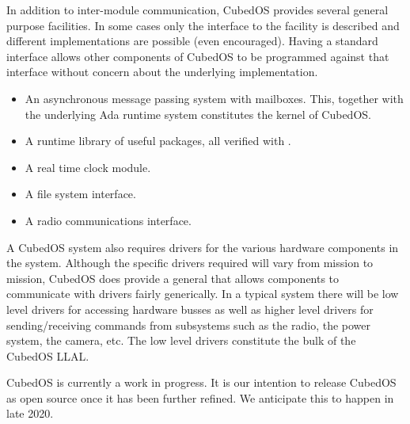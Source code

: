 
In addition to inter-module communication, CubedOS provides several general purpose facilities.
In some cases only the interface to the facility is described and different implementations are
possible (even encouraged). Having a standard interface allows other components of CubedOS to be
programmed against that interface without concern about the underlying implementation.

\begin{itemize}
\item An asynchronous message passing system with mailboxes. This, together with the underlying
  Ada runtime system constitutes the kernel of CubedOS.
\item A runtime library of useful packages, all verified with \SPARK.
\item A real time clock module.
\item A file system interface.
\item A radio communications interface.
\end{itemize}

A CubedOS system also requires drivers for the various hardware components in the system.
Although the specific drivers required will vary from mission to mission, CubedOS does provide a
general  that allows components to communicate with drivers fairly
generically. In a typical system there will be low level drivers for accessing hardware busses
as well as higher level drivers for sending/receiving commands from subsystems such as the
radio, the power system, the camera, etc. The low level drivers constitute the bulk of the
CubedOS LLAL.

CubedOS is currently a work in progress. It is our intention to release CubedOS as open source
once it has been further refined. We anticipate this to happen in late 2020.
